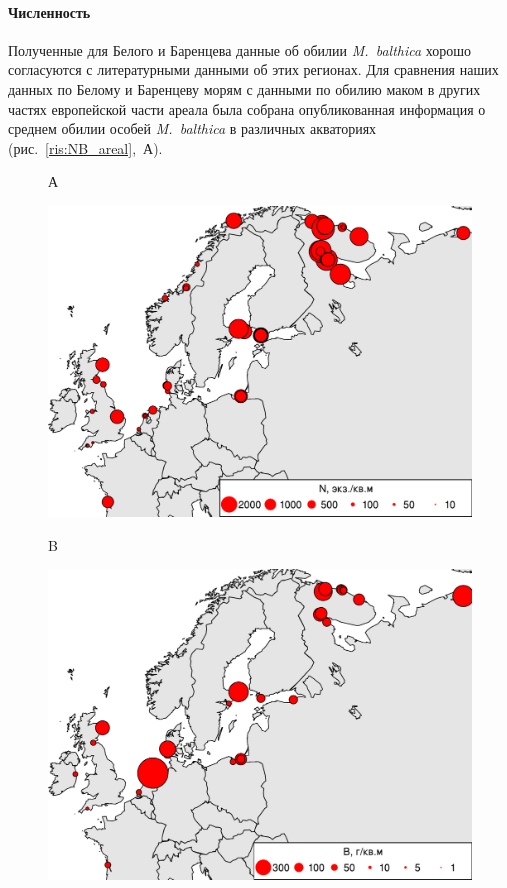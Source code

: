 {{\paragraph{Численность}
Полученные для Белого и Баренцева данные об обилии \textit{M.~balthica} хорошо согласуются с литературными данными об этих регионах.
Для сравнения наших данных по Белому и Баренцеву морям с данными по обилию маком в других частях европейской части ареала была собрана опубликованная информация о среднем обилии особей {\it M.~balthica} в различных акваториях (рис.~\ref{ris:NB_areal},~А).
	\begin{figure}[]
		\begin{minipage}[b]{.5\linewidth}
	{\small А}
			\begin{center}
			    \includegraphics[width=\textwidth]{../macrodistribution/Nmean_ru1.pdf}
			\end{center}
		\end{minipage}
	\hfil %
		\begin{minipage}[b]{.5\linewidth}
			{\small B}
			\begin{center}
				\includegraphics[width=\textwidth]{../macrodistribution/Bmean_ru1.pdf}

\end{center}
\end{minipage}
\end{figure}}}
